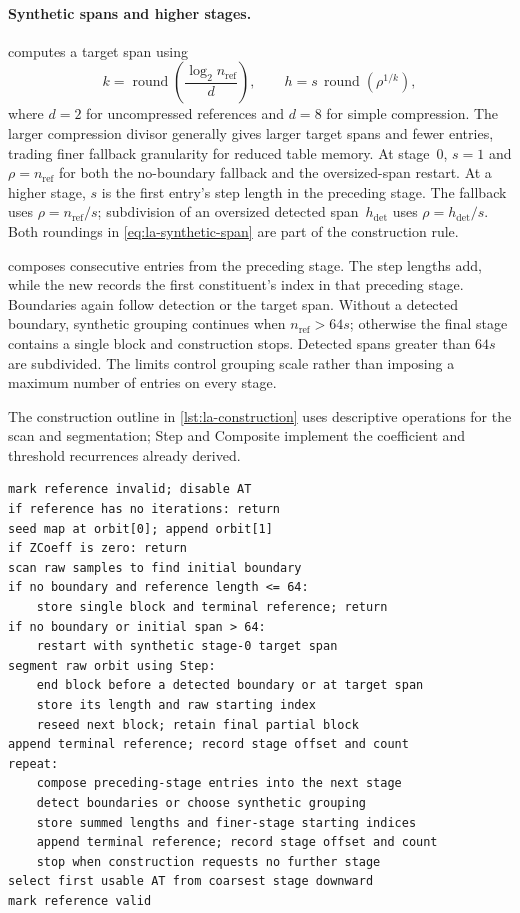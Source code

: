 \paragraph{Synthetic spans and higher stages.}
 computes a target span using
\begin{equation}
k=\operatorname{round}\!\left(
  \frac{\log_2 n_{\mathrm{ref}}}{d}\right),\qquad
h=s\,\operatorname{round}\!\left(\rho^{1/k}\right),
\label{eq:la-synthetic-span}
\end{equation}
where $d=2$ for uncompressed references and $d=8$ for simple
compression. The larger compression divisor generally gives larger
target spans and fewer entries, trading finer fallback granularity
for reduced table memory. At stage~0, $s=1$ and $\rho=n_{\mathrm{ref}}$ for both
the no-boundary fallback and the oversized-span restart. At a higher
stage, $s$ is the first entry's step length in the preceding stage.
The fallback uses $\rho=n_{\mathrm{ref}}/s$; subdivision of an
oversized detected span~$h_{\mathrm{det}}$ uses
$\rho=h_{\mathrm{det}}/s$. Both roundings in
\eqref{eq:la-synthetic-span} are part of the construction rule.

 composes consecutive entries from the
preceding stage. The step lengths add, while the new
 records the first constituent's index in that
preceding stage. Boundaries again follow detection or the target span.
Without a detected boundary, synthetic grouping continues when
$n_{\mathrm{ref}}>64s$; otherwise the final stage contains a single
block and construction stops. Detected spans greater than $64s$ are
subdivided. The limits control grouping scale rather than imposing a
maximum number of entries on every stage.

The construction outline in \cref{lst:la-construction} uses descriptive operations for the
scan and segmentation; Step and Composite implement the coefficient
and threshold recurrences already derived.

\begin{lstlisting}[float=htbp,caption={LA table construction outline},label={lst:la-construction}]
mark reference invalid; disable AT
if reference has no iterations: return
seed map at orbit[0]; append orbit[1]
if ZCoeff is zero: return
scan raw samples to find initial boundary
if no boundary and reference length <= 64:
    store single block and terminal reference; return
if no boundary or initial span > 64:
    restart with synthetic stage-0 target span
segment raw orbit using Step:
    end block before a detected boundary or at target span
    store its length and raw starting index
    reseed next block; retain final partial block
append terminal reference; record stage offset and count
repeat:
    compose preceding-stage entries into the next stage
    detect boundaries or choose synthetic grouping
    store summed lengths and finer-stage starting indices
    append terminal reference; record stage offset and count
    stop when construction requests no further stage
select first usable AT from coarsest stage downward
mark reference valid
\end{lstlisting}

